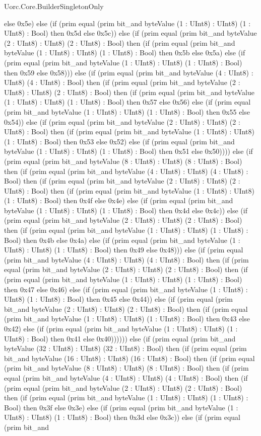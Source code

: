 \begin{lexlean}{Uorc.Core.BuilderSingletonOnly}
\begin{semanticmodule}
{else 0x5e) else (if (prim equal (prim bit_and byteValue (1 : UInt8) : UInt8) (1 : UInt8) : Bool) then 0x5d else 0x5c)) else (if (prim equal (prim bit_and byteValue (2 : UInt8) : UInt8) (2 : UInt8) : Bool) then (if (prim equal (prim bit_and byteValue (1 : UInt8) : UInt8) (1 : UInt8) : Bool) then 0x5b else 0x5a) else (if (prim equal (prim bit_and byteValue (1 : UInt8) : UInt8) (1 : UInt8) : Bool) then 0x59 else 0x58))) else (if (prim equal (prim bit_and byteValue (4 : UInt8) : UInt8) (4 : UInt8) : Bool) then (if (prim equal (prim bit_and byteValue (2 : UInt8) : UInt8) (2 : UInt8) : Bool) then (if (prim equal (prim bit_and byteValue (1 : UInt8) : UInt8) (1 : UInt8) : Bool) then 0x57 else 0x56) else (if (prim equal (prim bit_and byteValue (1 : UInt8) : UInt8) (1 : UInt8) : Bool) then 0x55 else 0x54)) else (if (prim equal (prim bit_and byteValue (2 : UInt8) : UInt8) (2 : UInt8) : Bool) then (if (prim equal (prim bit_and byteValue (1 : UInt8) : UInt8) (1 : UInt8) : Bool) then 0x53 else 0x52) else (if (prim equal (prim bit_and byteValue (1 : UInt8) : UInt8) (1 : UInt8) : Bool) then 0x51 else 0x50)))) else (if (prim equal (prim bit_and byteValue (8 : UInt8) : UInt8) (8 : UInt8) : Bool) then (if (prim equal (prim bit_and byteValue (4 : UInt8) : UInt8) (4 : UInt8) : Bool) then (if (prim equal (prim bit_and byteValue (2 : UInt8) : UInt8) (2 : UInt8) : Bool) then (if (prim equal (prim bit_and byteValue (1 : UInt8) : UInt8) (1 : UInt8) : Bool) then 0x4f else 0x4e) else (if (prim equal (prim bit_and byteValue (1 : UInt8) : UInt8) (1 : UInt8) : Bool) then 0x4d else 0x4c)) else (if (prim equal (prim bit_and byteValue (2 : UInt8) : UInt8) (2 : UInt8) : Bool) then (if (prim equal (prim bit_and byteValue (1 : UInt8) : UInt8) (1 : UInt8) : Bool) then 0x4b else 0x4a) else (if (prim equal (prim bit_and byteValue (1 : UInt8) : UInt8) (1 : UInt8) : Bool) then 0x49 else 0x48))) else (if (prim equal (prim bit_and byteValue (4 : UInt8) : UInt8) (4 : UInt8) : Bool) then (if (prim equal (prim bit_and byteValue (2 : UInt8) : UInt8) (2 : UInt8) : Bool) then (if (prim equal (prim bit_and byteValue (1 : UInt8) : UInt8) (1 : UInt8) : Bool) then 0x47 else 0x46) else (if (prim equal (prim bit_and byteValue (1 : UInt8) : UInt8) (1 : UInt8) : Bool) then 0x45 else 0x44)) else (if (prim equal (prim bit_and byteValue (2 : UInt8) : UInt8) (2 : UInt8) : Bool) then (if (prim equal (prim bit_and byteValue (1 : UInt8) : UInt8) (1 : UInt8) : Bool) then 0x43 else 0x42) else (if (prim equal (prim bit_and byteValue (1 : UInt8) : UInt8) (1 : UInt8) : Bool) then 0x41 else 0x40)))))) else (if (prim equal (prim bit_and byteValue (32 : UInt8) : UInt8) (32 : UInt8) : Bool) then (if (prim equal (prim bit_and byteValue (16 : UInt8) : UInt8) (16 : UInt8) : Bool) then (if (prim equal (prim bit_and byteValue (8 : UInt8) : UInt8) (8 : UInt8) : Bool) then (if (prim equal (prim bit_and byteValue (4 : UInt8) : UInt8) (4 : UInt8) : Bool) then (if (prim equal (prim bit_and byteValue (2 : UInt8) : UInt8) (2 : UInt8) : Bool) then (if (prim equal (prim bit_and byteValue (1 : UInt8) : UInt8) (1 : UInt8) : Bool) then 0x3f else 0x3e) else (if (prim equal (prim bit_and byteValue (1 : UInt8) : UInt8) (1 : UInt8) : Bool) then 0x3d else 0x3c)) else (if (prim equal (prim bit_and }
\end{semanticmodule}
\end{lexlean}
